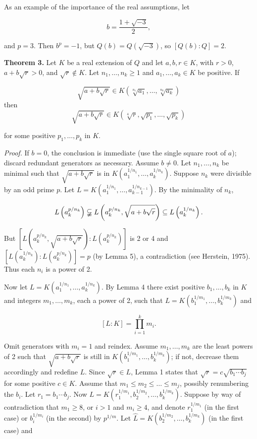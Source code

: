 \documentclass[11pt,letterpaper]{article}
\begin{document}
As an example of the importance of the real assumptions, let

\[
b=\frac{1+\sqrt{-3}}{2},
\]

and $p=3$. Then $b^{p}=-1$, but $Q(b)=Q(\sqrt{-3})$, so $[Q(b): Q]=2$.

\noindent\textbf{Theorem 3.} Let $K$ be a real extension of $Q$ and let $a,b,r\in K$, with $r>0$, $a+b\sqrt r>0$, and $\sqrt r\notin K$. Let $n_{1}, \ldots, n_{k} \geqslant 1$ and $a_{1}, \ldots, a_{k} \in K$ be positive. If

\[
\sqrt{a+b \sqrt{r}} \in K\left(\sqrt[n_{1}]{a_{1}}, \ldots, \sqrt[n_{k}]{a_{k}}\right)
\]
then
\[
\sqrt{a+b \sqrt{r}} \in K\left(\sqrt[4]{r}, \sqrt{p_{1}}, \ldots, \sqrt{p_{k}}\right)
\]

for some positive $p_{1}, \ldots, p_{k}$ in $K$.

\noindent\textit{Proof.} If $b=0$, the conclusion is immediate (use the single square root of $a$); discard redundant generators as necessary. Assume $b\ne0$. Let $n_{1},\ldots,n_k$ be minimal such that $\sqrt{a+b \sqrt{r}}$ is in $K\left(a_{1}^{1 / n_{1}}, \ldots, a_{k}^{1 / n_{k}}\right)$. Suppose $n_{k}$ were divisible by an odd prime $p$. Let $L=K\left(a_{1}^{1 / n_{1}}, \ldots, a_{k-1}^{1/n_{k-1}}\right)$. By the minimality of $n_{k}$,

\[
L\left(a_{k}^{p / n_{k}}\right) \varsubsetneqq L\left(a_{k}^{p / n_{k}}, \sqrt{a+b \sqrt{r}}\right) \subseteq L\left(a_{k}^{1 / n_{k}}\right) .
\]

But $\left[L\left(a_{k}^{p / n_{k}}, \sqrt{a+b \sqrt{r}}\right): L\left(a_{k}^{p / n_{k}}\right)\right]$ is 2 or 4 and $\left[L\left(a_{k}^{1 / n_{k}}\right): L\left(a_{k}^{p / n_{k}}\right)\right]=p$ (by Lemma 5), a contradiction (see Herstein, 1975). Thus each $n_{i}$ is a power of 2.

Now let $L=K\left(a_{1}^{1 / n_{1}}, \ldots, a_{k}^{1 / n_{k}}\right)$. By Lemma 4 there exist positive $b_{1}, \ldots, b_{k}$ in $K$ and integers $m_{1}, \ldots, m_{k}$, each a power of 2, such that $L=K\left(b_{1}^{1 / m_{1}}, \ldots, b_{k}^{1 / m_{k}}\right)$ and

\[
[L: K]=\prod_{i=1}^{k} m_{i} .
\]

Omit generators with $m_i=1$ and reindex. Assume $m_{1}, \ldots, m_{k}$ are the least powers of 2 such that $\sqrt{a+b \sqrt{r}}$ is still in $K\left(b_{1}^{1 / m_{1}}, \ldots, b_{k}^{1 / m_{k}}\right)$; if not, decrease them accordingly and redefine $L$. Since $\sqrt{r} \in L$, Lemma 1 states that $\sqrt{r}=c \sqrt{b_{1} \cdots b_{j}}$ for some positive $c\in K$. Assume that $m_1 \leqslant m_{2} \leqslant \ldots \leqslant m_{j}$, possibly renumbering the $b_{i}$. Let $r_{1}=b_{1} \cdots b_{j}$. Now $L=K\left(r_{1}^{1 / m_{1}}, b_{2}^{1 / m_{2}}, \ldots, b_{k}^{1 / m_{k}}\right)$. Suppose by way of contradiction that $m_{1} \geqslant 8$, or $i>1$ and $m_{i} \geqslant 4$, and denote $r_{1}^{1 / m_{1}}$ (in the first case) or $b_{i}^{1 / m_{i}}$ (in the second) by $p^{1 / m}$. Let $\hat{L}=K\left(b_{2}^{1 / m_{2}}, \ldots, b_{k}^{1 / m_{k}}\right)$ (in the first case) and
\end{document}
